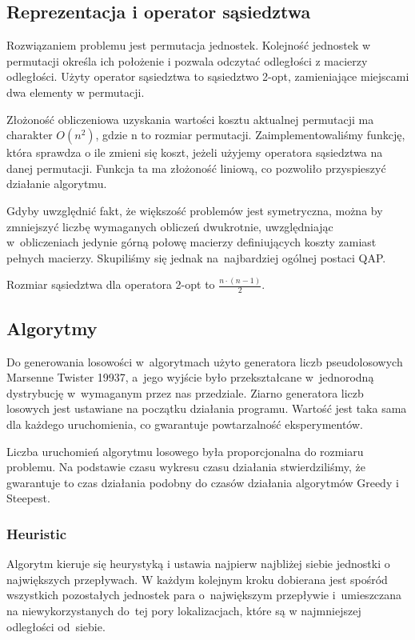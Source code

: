 \documentclass[a4paper,10pt]{article}
\begin{document}
\subsection{Reprezentacja i operator sąsiedztwa}
Rozwiązaniem problemu jest permutacja jednostek.
Kolejność jednostek w permutacji określa ich położenie i pozwala odczytać odległości z macierzy odległości.
Użyty operator sąsiedztwa to sąsiedztwo 2-opt, zamieniające miejscami dwa elementy w permutacji.

Złożoność obliczeniowa uzyskania wartości kosztu aktualnej permutacji ma charakter $O(n^2)$, gdzie n to rozmiar permutacji.
Zaimplementowaliśmy funkcję, która sprawdza o ile zmieni się koszt, jeżeli użyjemy operatora sąsiedztwa na danej permutacji.
Funkcja ta ma złożoność liniową, co pozwoliło przyspieszyć działanie algorytmu.

Gdyby uwzględnić fakt, że większość problemów jest symetryczna, można by zmniejszyć liczbę wymaganych obliczeń dwukrotnie,
uwzględniając w~obliczeniach jedynie górną połowę macierzy definiujących koszty zamiast pełnych macierzy.
Skupiliśmy się jednak na~najbardziej ogólnej postaci QAP.

Rozmiar sąsiedztwa dla operatora 2-opt to $\frac{n \cdot (n-1)}{2}$.

\subsection{Algorytmy}
Do generowania losowości w~algorytmach użyto generatora liczb pseudolosowych Marsenne Twister 19937,
a~jego wyjście było przekształcane w~jednorodną dystrybucję w~wymaganym przez nas przedziale.
Ziarno generatora liczb losowych jest ustawiane na początku działania programu.
Wartość jest taka sama dla każdego uruchomienia, co gwarantuje powtarzalność eksperymentów.

Liczba uruchomień algorytmu losowego była proporcjonalna do rozmiaru problemu.
Na podstawie czasu wykresu czasu działania stwierdziliśmy, że gwarantuje to czas działania podobny do czasów działania algorytmów Greedy i Steepest.

\subsubsection{Heuristic}
Algorytm kieruje się heurystyką i ustawia najpierw najbliżej siebie jednostki o największych przepływach.
W każdym kolejnym kroku dobierana jest spośród wszystkich pozostałych jednostek para o~największym przepływie
i~umieszczana na niewykorzystanych do~tej pory lokalizacjach, które są w najmniejszej odległości od~siebie.
\end{document}
